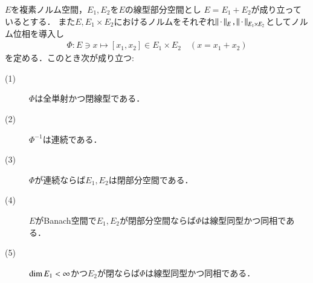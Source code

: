 	\begin{screen}
		\begin{lem}
			$E$を複素ノルム空間，$E_1,E_2$を$E$の線型部分空間とし
			$E = E_1 + E_2$が成り立っているとする\footnotemark．
			また$E,E_1 \times E_2$におけるノルムをそれぞれ$\left\|\, \cdot\, \right\|_{E},\left\|\, \cdot\, \right\|_{E_1 \times E_2}$としてノルム位相を導入し
			\begin{align}
				\Phi:E \ni x \longmapsto [x_1,x_2] \in E_1 \times E_2
				\quad (x = x_1 + x_2)
			\end{align}
			を定める．このとき次が成り立つ:
			\begin{description}
				\item[(1)] $\Phi$は全単射かつ閉線型である．
				\item[(2)] $\Phi^{-1}$は連続である．
				\item[(3)] $\Phi$が連続ならば$E_1,E_2$は閉部分空間である．
				\item[(4)] $E$がBanach空間で$E_1,E_2$が閉部分空間ならば$\Phi$は線型同型かつ同相である．
				\item[(5)] $\operatorname{dim} E_1 < \infty$かつ$E_2$が閉ならば$\Phi$は線型同型かつ同相である．
			\end{description}
		\end{lem}
	\end{screen}
	
	
